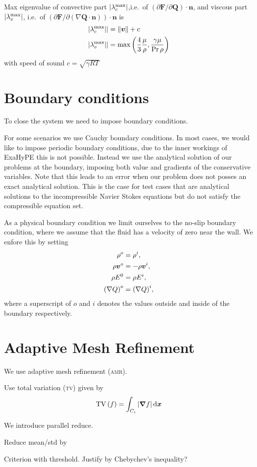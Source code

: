 Max eigenvalue of convective part $\vert \lambda_c^{\text{max}} \vert$,i.e.\ of $\left( \partial \bm{F}/\partial \bm{Q}\right) \cdot \bm{n}$,
and viscous part $\vert \lambda_v^{\text{max}} \vert$, i.e.\ of $\left( \partial \bm{F}/\partial \left( \nabla \bm{Q} \cdot \bm{n} \right)\right) \cdot \bm{n}$
is
\begin{align}
  \vert \lambda_c^{\text{max}} \vert \vert  &= \Vert \bm{v} \Vert + c\\
  \vert \lambda_v^{\text{max}} \vert \vert &= \max \left( \frac{4}{3} \frac{\mu}{\rho}
                                       , \frac{\gamma \mu}{\Pr \rho} \right)
\end{align}
with speed of sound $c = \sqrt{\gamma R T }$

\section{Boundary conditions}
To close the system we need to impose boundary conditions.

For some scenarios we use Cauchy boundary conditions.
In most cases, we would like to impose periodic boundary conditions, due to the inner workings of ExaHyPE this is not possible.
Instead we use the analytical solution of our problems at the boundary, imposing both value and gradients of the conservative variables.
Note that this leads to an error when our problem does not posses an exact analytical solution.
This is the case for test cases that are analytical solutions to the incompressible Navier Stokes equations but do not satisfy the compressible equation set.

As a physical boundary condition we limit ourselves to the no-slip boundary condition, where we assume that the fluid has a velocity of zero near the wall.
We enfore this by setting
\begin{align}
  \label{eq:no-slip}
  \begin{split}
  \rho^o &= \rho^i, \\
  \rho \bm{v}^o &= -\rho \bm{v}^i, \\
  \rho E^0 &= \rho E^i,\\
  {(\nabla Q)}^o &= {(\nabla Q)}^i,
  \end{split}
\end{align}
where a superscript of $o$ and $i$ denotes the values outside and inside of the boundary respectively.

\section{Adaptive Mesh Refinement}
\label{sec:amr}
We use adaptive mesh refinement (\textsc{amr}).

Use total variation (\textsc{tv}) given by
\begin{equation}
  \label{eq:tv}
  \operatorname{TV}\left( f \right) =
\intdcell{ \vert \gradient{f} \vert }
\end{equation}

We introduce parallel reduce.

Reduce mean/std by~\cite{chan1982updating}

Criterion with threshold.
Justify by Chebychev's inequality?

